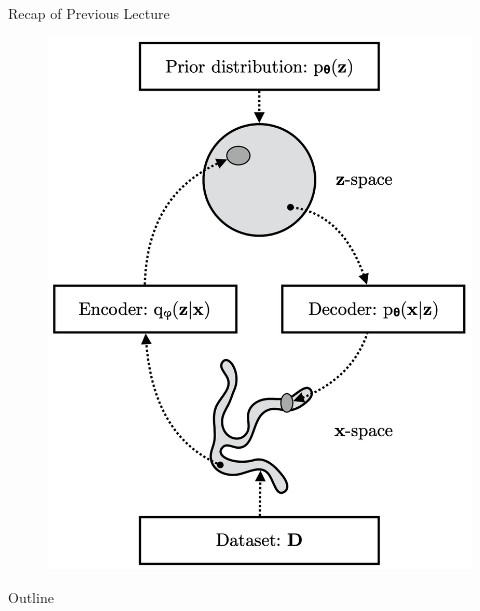 \documentclass{beamer}
\begin{document}
\begin{frame}{Recap of Previous Lecture}
\begin{minipage}[t]{0.4\columnwidth}
\begin{figure}[h]
			\includegraphics[width=\linewidth]{figs/vae_scheme}
		\end{figure}
	\end{minipage}
\end{frame}
\begin{frame}{Outline}
	\tableofcontents
\end{frame}
\end{document}
